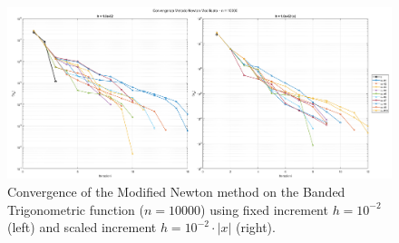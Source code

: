 \documentclass[a4paper,12pt]{article}
\begin{document}
	\newpage
	
	\begin{figure}[H]
		\centering
		\includegraphics[width=\textwidth]{../immagini/banded_10k_h2.png}
		\caption{Convergence of the Modified Newton method on the Banded Trigonometric function ($n=10000$) using fixed increment $h = 10^{-2}$ (left) and scaled increment $h = 10^{-2}\cdot|x|$ (right).}
		\label{fig:bt_fd_10k_h2}
	\end{figure}
	
\end{document}
